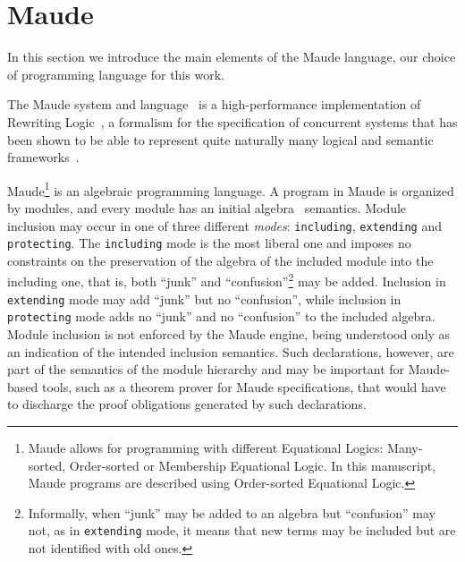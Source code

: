 \documentclass[a4paper,openany]{book}
\begin{document}
\section{Maude}\label{sec:pre-maude}

In this section we introduce the main elements of the Maude language, our choice of programming language for this work. 

The Maude system and language~\cite{Clavel:2007:MHL:1808998} is a high-performance implementation of Rewriting Logic~\cite{meseguer92}, a formalism for the specification of concurrent systems that has been shown to be able to represent quite naturally many logical and semantic frameworks~\cite{marti-oliet-meseguer:2002}.

Maude\footnote{Maude allows for programming with different Equational Logics: Many-sorted, Order-sorted or Membership Equational Logic. In this manuscript, Maude programs are described using Order-sorted Equational Logic.}
is an algebraic programming language. A program in Maude is organized by modules, and every module has an initial algebra~\cite{Goguen:1996:ASI:547173} semantics. Module inclusion may occur in one of three different \emph{modes}: \texttt{including}, \texttt{extending} and \texttt{protecting}. The \texttt{including} mode is the most liberal one and imposes no constraints on the preservation of the algebra of the included module into the including one, that is, both ``junk''  and ``confusion''\footnote{Informally, when ``junk'' may be added  to an algebra but ``confusion'' may not, as in \texttt{extending} mode, it means that new terms may be included but are not identified with old ones.} may be added. Inclusion in \texttt{extending} mode may add ``junk'' but no ``confusion'', while inclusion in \texttt{protecting} mode adds no ``junk'' and no ``confusion'' to the included algebra. Module inclusion is not enforced by the Maude engine, being understood only as an indication of the intended inclusion semantics. Such declarations, however, are part of the semantics of the module hierarchy and may be important for Maude-based tools, such as a theorem prover for Maude specifications, that would have to discharge the proof obligations generated by such declarations. 
\end{document}
